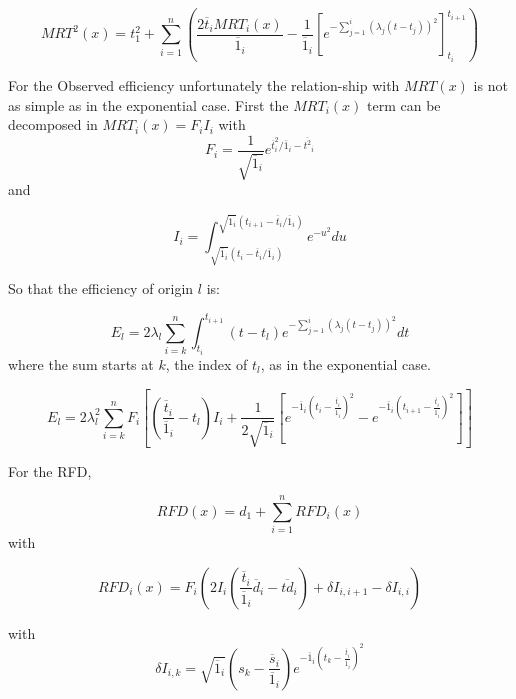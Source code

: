 \documentclass[10pt,a4paper]{revtex4-2}
\newcommand{\avgk}[1]{\overline{#1}_i}
\begin{document}
\begin{equation}\label{app:mrt_wei}
MRT^2(x) = t^2_1  + \sum_{i=1}^{n} \left(\frac{2\avgk t MRT_i(x)}{\avgk 1}  - \frac{1}{\avgk 1} \left[ e^{-\sum_{j=1}^i (\lambda_j(t-t_j))^2}\right]_{t_i}^{t_{i+1}} \right)
\end{equation}

For the Observed efficiency unfortunately the relation-ship with $MRT(x)$ is not as simple as in the exponential case. First the $MRT_i(x)$ term can be decomposed in $MRT_i(x)=F_i I_i$ with 
\begin{equation}
F_i=\frac{1}{\sqrt{\avgk 1}}e^{\avgk t ^2/\avgk 1-\avgk {t^2}}
\end{equation}
and 


\begin{equation}
I_i=\int_{\sqrt{\avgk 1}(t_i-\avgk t /\avgk 1)}^{\sqrt{\avgk 1}(t_{i+1}-\avgk t /\avgk 1)}e^{-u^2}du
\end{equation}

So that the efficiency of origin $l$ is:

\begin{equation}
E_l =  2\lambda_l \sum_{i=k}^{n}\int_{t_i}^{t_{i+1}}(t-t_l)e^{-\sum_{j=1}^i (\lambda_j(t-t_j))^2}dt
\end{equation}
where the sum starts at  $k$, the index of $t_l$, as in the exponential case. 

\begin{equation}
E_l = 2\lambda_l^2\sum_{i=k}^{n} F_i\left[\left(\frac{\avgk t}{\avgk 1}-t_l\right)I_i
 +\frac{1}{2 \sqrt{\avgk 1}} \left[ e^{-\avgk 1\left(t_i-\frac{\avgk t}{\avgk 1}\right)^2} - e^{-\avgk 1\left(t_{i+1}-\frac{\avgk t}{\avgk 1}\right)^2}\right]\right]
\end{equation}

For the RFD,

\begin{equation}
RFD(x) = d_1+ \sum_{i=1}^{n}RFD_i(x)
\end{equation}
with

\begin{equation}
RFD_i(x) = F_i\left(2 I_i \left(\frac{\avgk t}{\avgk 1} \avgk d - \avgk {td}\right) + \delta I_{i,i+1}-\delta I_{i,i}\right)
\end{equation}

with 
\begin{equation}
\delta I_{i,k} = \sqrt{\avgk 1}\left(s_{k}-\frac{\avgk s}{\avgk 1}\right)e^{-\avgk 1 \left(t_{k}-\frac{\avgk t}{\avgk 1}\right)^2}
\end{equation}
\end{document}
